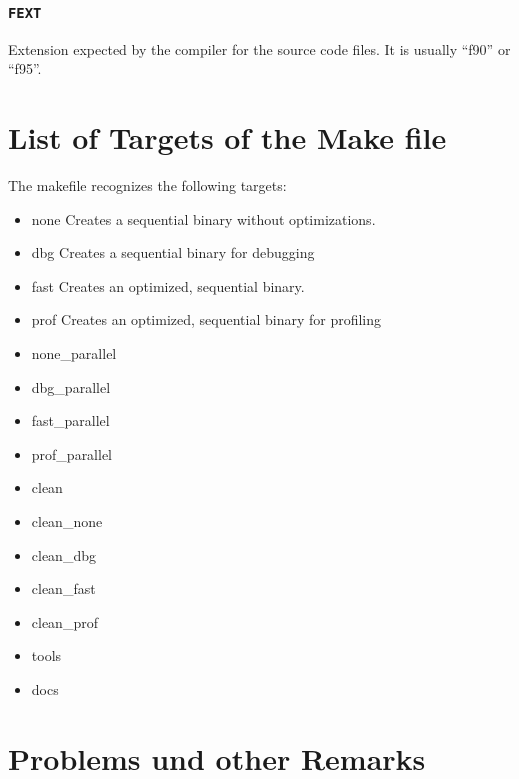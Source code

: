 \documentclass[a4paper,10pt]{report}
\newcommand{\mytt}[1]{{\tt #1}}
\begin{document}
\subsection{\mytt{FEXT}}
Extension expected by the compiler for the source code files. It is
usually ``f90'' or ``f95''.


\chapter{List of Targets of the Make file}

The makefile recognizes the following targets:
\begin{itemize}
\item {none} Creates a sequential binary without optimizations. 
\item {dbg} Creates a sequential binary for debugging
\item {fast} Creates an optimized, sequential binary.
\item {prof} Creates an optimized, sequential binary for profiling
\item {none\_parallel}
\item {dbg\_parallel}
\item {fast\_parallel}
\item {prof\_parallel}
\item  {clean}
\item {clean\_none}
\item {clean\_dbg}
\item {clean\_fast}
\item {clean\_prof}
\item {tools}
\item {docs}
\end{itemize}



\chapter{Problems und other Remarks}
\end{document}
